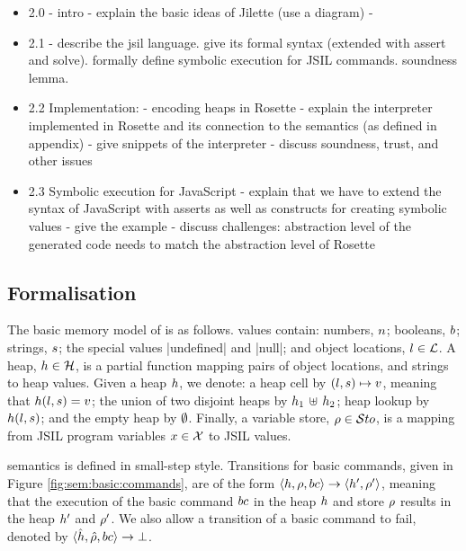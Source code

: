 
\begin{itemize}
  \item 2.0  - intro - explain the basic ideas of Jilette (use a diagram) - 
 
  \item 2.1 - describe the jsil language. give its formal syntax (extended with assert and solve). 
                   formally define symbolic execution for JSIL commands. soundness lemma. 
 
  \item 2.2 Implementation:  
               - encoding \jsil heaps in Rosette 
               - explain the \jsil interpreter implemented in Rosette and its connection to the \jsil semantics (as defined in appendix) 
               - give snippets of the interpreter 
               - discuss soundness, trust, and other issues
 
  \item 2.3 Symbolic execution for JavaScript 
              - explain that we have to extend the syntax of JavaScript with asserts  as well as constructs for creating symbolic values
              - give the example 
              - discuss challenges: abstraction level of the generated code needs to match the abstraction level of Rosette 
\end{itemize}

\subsection{Formalisation}

The basic memory model of \jsil is as follows. 
\jsil values contain: numbers, $n$; booleans, $b$; strings, $s$;  the special values \jsinline|undefined| and \jsinline|null|; and object locations,  $l \in {\mathcal L}$.
A \jsil heap, $h \in {\mathcal H}$, is a partial function mapping pairs of  object locations, and strings to heap values. 
 Given a heap $h$, we denote: a heap cell by $(l, s) \mapsto v$, meaning that  $h(l,s) = v$; the union of two disjoint heaps by $h_1 \, \uplus \, h_2$; heap lookup by $h(l, s)$; and the empty heap by $\emptyset$.
 Finally, a \jsil variable store, $\rho \in \mathcal{S}to$, is a mapping from JSIL program variables $x \in \mathcal{X}$ to JSIL values.

\jsil semantics is defined in small-step style. Transitions for basic commands, given in Figure \ref{fig:sem:basic:commands}, are of the form $\semtrans{\heap, \store, \bcmd}{\heap', \store'}$, meaning that the execution of the basic command $bc$ in the heap $h$ and store $\rho$ results in the heap $h'$ and $\rho'$. We also allow a transition of a basic command to fail, denoted by $\semtranserr{\sheap, \sstore, \bcmd}$.

